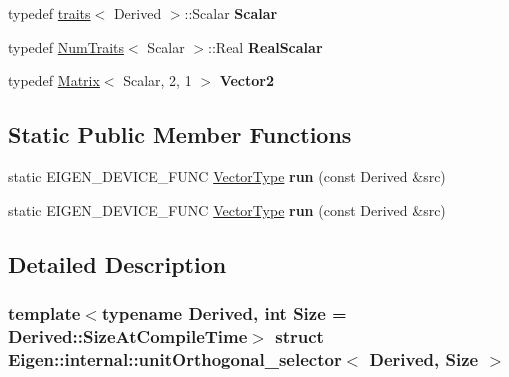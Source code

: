\begin{DoxyCompactItemize}
\item 
\mbox{\label{struct_eigen_1_1internal_1_1unit_orthogonal__selector_a5cb64d039b9a1510ece90194f6c9f0ec}} 
typedef \hyperlink{struct_eigen_1_1internal_1_1traits}{traits}$<$ Derived $>$\+::Scalar {\bfseries Scalar}
\item 
\mbox{\label{struct_eigen_1_1internal_1_1unit_orthogonal__selector_a6c53727bb80397fcb53e42fb76c7de1b}} 
typedef \hyperlink{group___core___module_struct_eigen_1_1_num_traits}{Num\+Traits}$<$ Scalar $>$\+::Real {\bfseries Real\+Scalar}
\item 
\mbox{\label{struct_eigen_1_1internal_1_1unit_orthogonal__selector_a79907d0ae18d8b1b56f889972fc820e8}} 
typedef \hyperlink{group___core___module_class_eigen_1_1_matrix}{Matrix}$<$ Scalar, 2, 1 $>$ {\bfseries Vector2}
\end{DoxyCompactItemize}
\subsection*{Static Public Member Functions}
\begin{DoxyCompactItemize}
\item 
\mbox{\label{struct_eigen_1_1internal_1_1unit_orthogonal__selector_aecbdce8658a875885d4326352dec272c}} 
static E\+I\+G\+E\+N\+\_\+\+D\+E\+V\+I\+C\+E\+\_\+\+F\+U\+NC \hyperlink{struct_vector_type}{Vector\+Type} {\bfseries run} (const Derived \&src)
\item 
\mbox{\label{struct_eigen_1_1internal_1_1unit_orthogonal__selector_aecbdce8658a875885d4326352dec272c}} 
static E\+I\+G\+E\+N\+\_\+\+D\+E\+V\+I\+C\+E\+\_\+\+F\+U\+NC \hyperlink{struct_vector_type}{Vector\+Type} {\bfseries run} (const Derived \&src)
\end{DoxyCompactItemize}


\subsection{Detailed Description}
\subsubsection*{template$<$typename Derived, int Size = Derived\+::\+Size\+At\+Compile\+Time$>$\newline
struct Eigen\+::internal\+::unit\+Orthogonal\+\_\+selector$<$ Derived, Size $>$}



